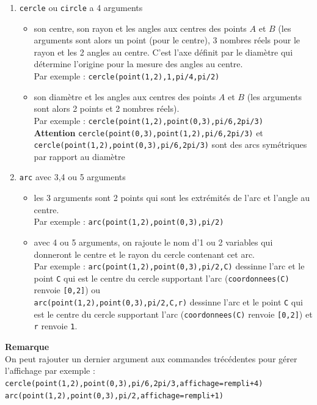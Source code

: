 \documentclass[a4paper,11pt]{book}
\begin{document}
\begin{enumerate} 
\item {\tt cercle} ou {\tt circle} a 4 arguments
\begin{itemize}
\item son centre, son rayon et les angles aux centres des points $A$ et $B$ 
(les arguments sont alors un point (pour le centre), 3 nombres r\'eels pour le 
rayon et les 2 angles au centre. C'est l'axe d\'efinit par le diam\`etre qui d\'etermine l'origine pour la mesure des angles au centre.\\
Par exemple : {\tt cercle(point(1,2),1,pi/4,pi/2)}
\item son diam\`etre  et les angles aux centres des points $A$ et $B$ (les arguments sont alors 2 points et 2 nombres r\'eels).\\
Par exemple : {\tt cercle(point(1,2),point(0,3),pi/6,2pi/3)}\\
{\bf Attention}
{\tt cercle(point(0,3),point(1,2),pi/6,2pi/3)} et {\tt cercle(point(1,2),point(0,3),pi/6,2pi/3)} sont des arcs sym\'etriques par rapport au diam\`etre
\end{itemize}
\item {\tt arc} avec 3,4 ou 5 arguments
\begin{itemize}
\item les 3 arguments sont 2 points qui sont les  extr\'emit\'es de l'arc et 
l'angle au centre.\\
Par exemple : {\tt arc(point(1,2),point(0,3),pi/2)}
\item avec 4 ou 5 arguments, on rajoute le nom d'1 ou 2 variables qui donneront
le centre et le rayon du cercle contenant cet arc.\\ 
Par exemple : {\tt arc(point(1,2),point(0,3),pi/2,C)} dessinne l'arc et le point {\tt C} qui est le centre du cercle supportant l'arc ({\tt coordonnees(C)} renvoie {\tt [0,2]}) ou\\
{\tt arc(point(1,2),point(0,3),pi/2,C,r)}
dessinne l'arc et le point {\tt C} qui est le centre du cercle supportant l'arc ({\tt coordonnees(C)} renvoie {\tt [0,2]}) et {\tt r} renvoie {\tt 1}.
\end{itemize}
\end{enumerate}
{\bf Remarque}\\
On peut rajouter un dernier argument aux commandes tr\'ec\'edentes pour g\'erer
l'affichage par exemple :\\
{\tt cercle(point(1,2),point(0,3),pi/6,2pi/3,affichage=rempli+4)}\\
{\tt  arc(point(1,2),point(0,3),pi/2,affichage=rempli+1)}
\end{document}

